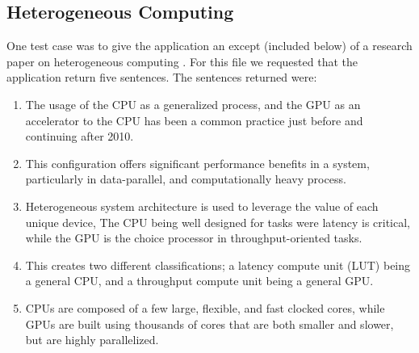 \subsection{Heterogeneous Computing}
One test case was to give the application an except (included below) of a research paper on heterogeneous computing \cite{noahpaper}.
For this file we requested that the application return five sentences. The sentences returned were:
\begin{enumerate}
	\item The usage of the CPU as a generalized process, and the GPU as an accelerator to the CPU has been a common practice just before and continuing after 2010.
	\item This configuration offers significant performance benefits in a system, particularly in data-parallel, and computationally heavy process.
	\item Heterogeneous system architecture is used to leverage the value of each unique device, The CPU being well designed for tasks were latency is critical, while the GPU is the choice processor in throughput-oriented tasks.
	\item This creates two different classifications; a latency compute unit (LUT) being a general CPU, and a throughput compute unit being a general GPU.
	\item CPUs are composed of a few large, flexible, and fast clocked cores, while GPUs are built using thousands of cores that are both smaller and slower, but are highly parallelized.
\end{enumerate}
